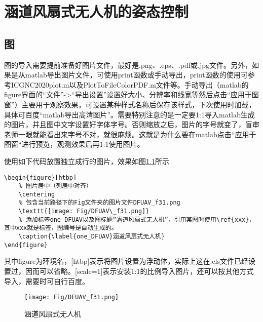 \chapter{涵道风扇式无人机的姿态控制}


\section{图}
图的导入需要提前准备好图片文件，最好是.png、.eps、.pdf或.jpg文件。另外，如果是从matlab导出图片文件，可使用print函数或手动导出，print函数的使用可参考ICGNC2020plot.m以及PlotToFileColorPDF.m文件等。手动导出（matlab的figure界面的“文件”->“导出设置”设置好大小、分辨率和线宽等然后点击“应用于图窗”）主要用于观察效果，可设置某种样式名称后保存该样式，下次使用时加载，具体可百度“matlab导出高清图片”。需要特别注意的是一定要1:1导入matlab生成的图片，并且图中文字设置好字体字号。否则缩放之后，图片的字号就变了，盲审老师一眼就能看出来字号不对，就很麻烦。这就是为什么要在matlab点击“应用于图窗“进行预览，观测效果后再1:1使用图片。

使用如下代码放置独立成行的图片，效果如图\ref{one_DFUAV}所示
\begin{lstlisting}
\begin{figure}[htbp]
	% 图片居中（列居中对齐）
	\centering	
	% 包含当前路径下的Fig文件夹的图片文件DFUAV_f31.png
	\texttt{[image: Fig/DFUAV\_f31.png]} 
	% 添加标签one_DFUAV以及图标题“涵道风扇式无人机”，引用某图时使用\ref{xxx}，其中xxx就是标签，图编号是自动生成的。
	\caption{\label{one_DFUAV}涵道风扇式无人机} 
\end{figure}
\end{lstlisting}
其中figure为环境名，[htbp]表示将图片设置为浮动体，实际上这在.cls文件已经设置过，因而可以省略。[scale=1]表示安装1:1的比例导入图片，还可以按其他方式导入，需要时可自行百度。
\begin{figure}[htbp]
	\centering
	\texttt{[image: Fig/DFUAV\_f31.png]}
	\caption{\label{one_DFUAV}涵道风扇式无人机}
\end{figure}

